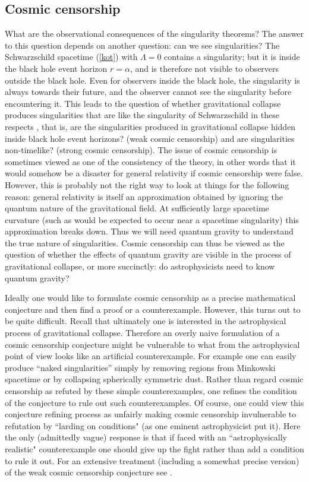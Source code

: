 \documentclass[12pt]{iopart}
\begin{document}
\subsection{Cosmic censorship}\label{subsec:CC}

What are the observational consequences of the singularity theorems?  The answer to this question depends on another question: can we see singularities?  The Schwarzschild spacetime (\ref{kot}) with $\Lambda =0$ contains a singularity; but it is inside the black hole event horizon $r=\alpha$, and is therefore not visible to observers outside the black hole.  Even for observers inside the black hole, the singularity is always towards their future, and the observer cannot see the singularity before encountering it.  This leads to the question of whether gravitational collapse produces singularities that are like the singularity of Schwarzschild in these 
respects \cite{P6}, that is, are the singularities produced in gravitational collapse hidden inside black hole event horizons? (weak cosmic censorship) and are singularities non-timelike? (strong cosmic censorship).  The issue of cosmic censorship is sometimes viewed as one of the consistency of the theory, in other words that it would somehow be a disaster for general relativity if cosmic censorship were false.  However, this is probably not the right way to look at things for the following reason: general relativity is itself an approximation obtained by ignoring the quantum nature of the gravitational field.  At sufficiently large spacetime curvature (such as would be expected to occur near a spacetime singularity) this approximation breaks down.  Thus we will need quantum gravity to understand the true nature of singularities.  Cosmic censorship can thus be viewed as the question of whether the effects of quantum gravity are visible in the process of gravitational collapse, or more succinctly: do astrophysicists need to know quantum gravity?

Ideally one would like to formulate cosmic censorship as a precise mathematical conjecture and then find a proof or a counterexample.  However, this turns out to be quite difficult.  Recall that ultimately one is interested in the astrophysical process of gravitational collapse.  Therefore an overly naive formulation of a cosmic censorship conjecture might be vulnerable to what from the astrophysical point of view looks like an artificial counterexample.  For example one can easily produce ``naked singularities'' \cite{P4,PI} simply by removing regions from Minkowski spacetime \cite{GH} or by collapsing spherically symmetric dust.  Rather than regard cosmic censorship as refuted by these simple counterexamples, one refines the condition of the conjecture to rule out such counterexamples.  Of course, one could view this conjecture refining process as unfairly making cosmic censorship invulnerable to refutation by ``larding on conditions" (as one eminent astrophysicist put it).  Here the only (admittedly vague) response is that if faced with an ``astrophysically realistic" counterexample one should give up the fight rather than add a condition to rule it out.  For an extensive treatment (including a somewhat precise version) of the weak cosmic censorship conjecture see \cite{Wald1}.
\end{document}
